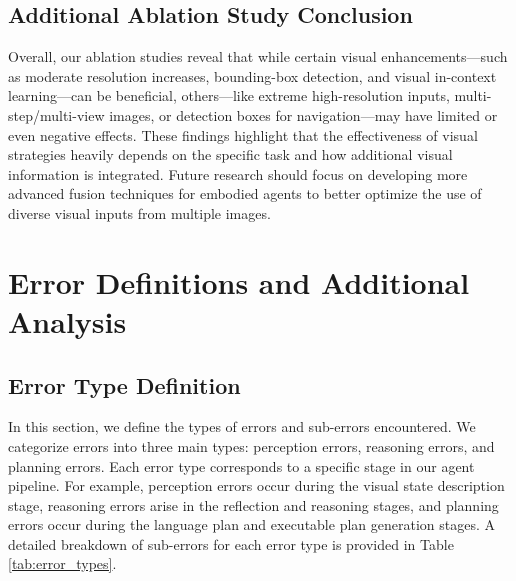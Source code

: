 \subsection{Additional Ablation Study Conclusion}
Overall, our ablation studies reveal that while certain visual enhancements—such as moderate resolution increases, bounding-box detection, and visual in-context learning—can be beneficial, others—like extreme high-resolution inputs, multi-step/multi-view images, or detection boxes for navigation—may have limited or even negative effects. These findings highlight that the effectiveness of visual strategies heavily depends on the specific task and how additional visual information is integrated. Future research should focus on developing more advanced fusion techniques for embodied agents to better optimize the use of diverse visual inputs from multiple images.







\section{Error Definitions and Additional Analysis}\label{appendix_error}
\subsection{Error Type Definition}
In this section, we define the types of errors and sub-errors encountered. We categorize errors into three main types: perception errors, reasoning errors, and planning errors. Each error type corresponds to a specific stage in our agent pipeline. For example, perception errors occur during the visual state description stage, reasoning errors arise in the reflection and reasoning stages, and planning errors occur during the language plan and executable plan generation stages. A detailed breakdown of sub-errors for each error type is provided in Table \ref{tab:error_types}.

